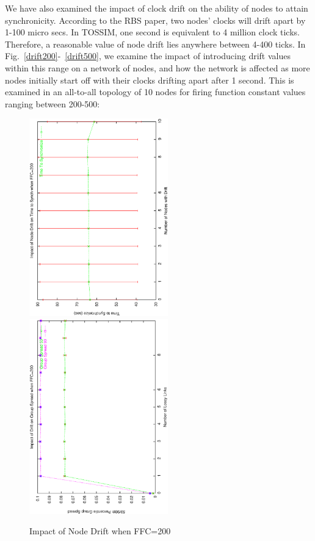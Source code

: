 
We have also examined the impact of clock drift on the ability of nodes to attain synchronicity.
According to the RBS paper, two nodes' clocks will drift apart by 1-100 micro secs. In TOSSIM,
one second is equivalent to 4 million clock ticks. Therefore, a reasonable value of node
drift lies anywhere between 4-400 ticks.  In Fig.~\ref{drift200}-~\ref{drift500}, we examine the impact
of introducing drift values within this range on a network of nodes, and how the network
is affected as more nodes initially start off with their clocks drifting apart after 1 second.
This is examined in an all-to-all topology of 10 nodes for firing function constant values 
ranging between 200-500:

\begin{figure}
\centerline{%
\includegraphics[width=6cm,angle=270]{figures/TTSvsDriftFFC200.ps}
\includegraphics[width=6cm,angle=270]{figures/GSvsDriftFFC200.ps}
}
\caption{Impact of Node Drift when FFC=200}
\label{fig:drift200}
\end{figure}


